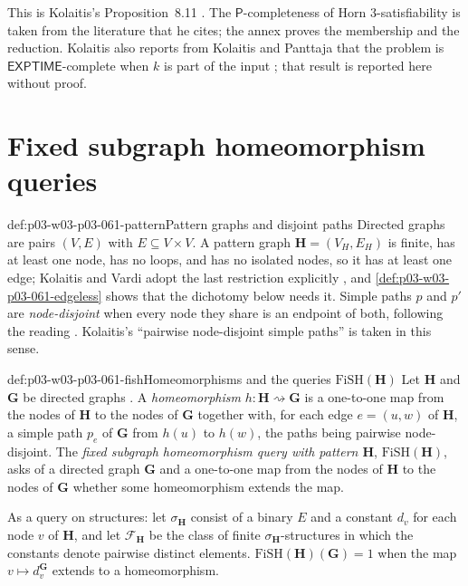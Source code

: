This is Kolaitis's Proposition~8.11
\cite[Prop.~8.11, pp.~75--76]{Kolaitis2003ExpressivePowerNotes}. The
\(\mathsf P\)-completeness of Horn 3-satisfiability is taken from the
literature that he cites; the annex proves the membership and the reduction.
Kolaitis also reports from Kolaitis and Panttaja that the problem is
\(\mathsf{EXPTIME}\)-complete when \(k\) is part of the input
\cite[Thm~8.12, p.~77]{Kolaitis2003ExpressivePowerNotes}; that result is
reported here without proof.

\section{Fixed subgraph homeomorphism queries}
\label{sec:p03-w03-p03-061-fish}

\begin{hbconvention}{def:p03-w03-p03-061-pattern}{Pattern graphs and disjoint paths}
Directed graphs are pairs \((V,E)\) with \(E\subseteq V\times V\). A
pattern graph \(\mathbf H=(V_H,E_H)\) is finite, has at least one node,
has no loops, and has no isolated nodes, so it has at least one edge; Kolaitis and Vardi adopt the last restriction explicitly
\cite[p.~22]{KolaitisVardi1995DatalogManuscript}, and
\cref{def:p03-w03-p03-061-edgeless} shows that the dichotomy below needs it.
Simple paths \(p\) and \(p'\) are \emph{node-disjoint} when every node they
share is an endpoint of both, following the reading
\cite[p.~22, n.~3]{KolaitisVardi1995DatalogManuscript}. Kolaitis's
``pairwise node-disjoint simple paths'' is taken in this sense.
\end{hbconvention}

\begin{hbdefinition}{def:p03-w03-p03-061-fish}{Homeomorphisms and the queries \(\mathrm{FiSH}(\mathbf H)\)}
Let \(\mathbf H\) and \(\mathbf G\) be directed graphs
\cite[Defs~8.13--8.14, p.~77]{Kolaitis2003ExpressivePowerNotes}. A
\emph{homeomorphism} \(h\colon\mathbf H\rightsquigarrow\mathbf G\) is a
one-to-one map from the nodes of \(\mathbf H\) to the nodes of \(\mathbf G\)
together with, for each edge \(e=(u,w)\) of \(\mathbf H\), a simple path
\(p_e\) of \(\mathbf G\) from \(h(u)\) to \(h(w)\), the paths being pairwise
node-disjoint. The \emph{fixed subgraph homeomorphism query with pattern
\(\mathbf H\)}, \(\mathrm{FiSH}(\mathbf H)\), asks of a directed graph
\(\mathbf G\) and a one-to-one map from the nodes of \(\mathbf H\) to the
nodes of \(\mathbf G\) whether some homeomorphism extends the map.

As a query on structures: let \(\sigma_{\mathbf H}\) consist of a binary
\(E\) and a constant \(d_v\) for each node \(v\) of \(\mathbf H\), and let
\(\mathcal F_{\mathbf H}\) be the class of finite
\(\sigma_{\mathbf H}\)-structures in which the constants denote pairwise
distinct elements. \(\mathrm{FiSH}(\mathbf H)(\mathbf G)=1\) when the map
\(v\mapsto d_v^{\mathbf G}\) extends to a homeomorphism.
\end{hbdefinition}

